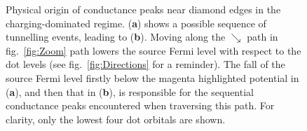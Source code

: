 \documentclass[a4paper,11pt]{article}
\begin{document}
\begin{figure}
\begin{center}
{
        }
        \caption{Physical origin of conductance peaks near diamond edges in the charging-dominated regime. (\textbf{a}) shows a possible sequence of tunnelling events, leading to (\textbf{b}). Moving along the {\color{magenta}$\searrow$} path in fig.~\ref{fig:Zoom} path lowers the source Fermi level with respect to the dot levels (see fig.~\ref{fig:Directions} for a reminder). The fall of the source Fermi level firstly below the magenta highlighted potential in (\textbf{a}), and then that in (\textbf{b}), is responsible for the sequential conductance peaks encountered when traversing this path. For clarity, only the lowest four dot orbitals are shown.}
        \label{fig:Strange-line}
    \end{center}
    \end{figure}

\end{document}
